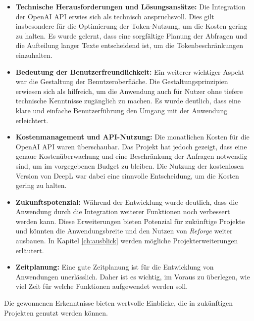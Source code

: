 \begin{itemize}
    \item \textbf{Technische Herausforderungen und Lösungsansätze:} Die Integration der OpenAI \ac{API} erwies sich als technisch anspruchsvoll. Dies gilt insbesondere für die Optimierung der Token-Nutzung, um die Kosten gering zu halten. Es wurde gelernt, dass eine sorgfältige Planung der Abfragen und die Aufteilung langer Texte entscheidend ist, um die Tokenbeschränkungen einzuhalten.
    \item \textbf{Bedeutung der Benutzerfreundlichkeit:} Ein weiterer wichtiger Aspekt war die Gestaltung der Benutzeroberfläche. Die Gestaltungsprinzipien erwiesen sich als hilfreich, um die Anwendung auch für Nutzer ohne tiefere technische Kenntnisse zugänglich zu machen. Es wurde deutlich, dass eine klare und einfache Benutzerführung den Umgang mit der Anwendung erleichtert.
    \item \textbf{Kostenmanagement und \ac{API}-Nutzung:} Die monatlichen Kosten für die OpenAI \ac{API} waren überschaubar. Das Projekt hat jedoch gezeigt, dass eine genaue Kostenüberwachung und eine Beschränkung der Anfragen notwendig sind, um im vorgegebenen Budget zu bleiben. Die Nutzung der kostenlosen Version von DeepL war dabei eine sinnvolle Entscheidung, um die Kosten gering zu halten.
    \item \textbf{Zukunftspotenzial:} Während der Entwicklung wurde deutlich, dass die Anwendung durch die Integration weiterer Funktionen noch verbessert werden kann. Diese Erweiterungen bieten Potenzial für zukünftige Projekte und könnten die Anwendungsbreite und den Nutzen von \textit{Reforge} weiter ausbauen. In Kapitel \ref{ch:ausblick} werden mögliche Projekterweiterungen erläutert.
    \item \textbf{Zeitplanung:} Eine gute Zeitplanung ist für die Entwicklung von Anwendungen unerlässlich. Daher ist es wichtig, im Voraus zu überlegen, wie viel Zeit für welche Funktionen aufgewendet werden soll.
\end{itemize}

Die gewonnenen Erkenntnisse bieten wertvolle Einblicke, die in zukünftigen Projekten genutzt werden können.